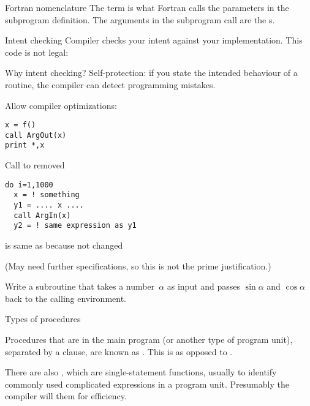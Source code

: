 \begin{block}{Fortran nomenclature}
  \label{sl:fortran-dummy}
  The term  is what Fortran calls the
  parameters in the subprogram definition. The arguments in the
  subprogram call are the s.
\end{block}

\begin{block}{Intent checking}
  \label{sl:fintent}
  Compiler checks your intent against your implementation. This code
  is not legal:

\end{block}

\begin{block}{Why intent checking?}
\label{sl:intentwhy}
Self-protection: if you state the intended behaviour of a routine, the
compiler can detect programming mistakes.

Allow compiler optimizations:

\begin{multicols}{2}
\begin{verbatim}
x = f()
call ArgOut(x)
print *,x
\end{verbatim}
Call to  removed
\vfill\columnbreak
\begin{verbatim}
do i=1,1000
  x = ! something
  y1 = .... x ....
  call ArgIn(x)
  y2 = ! same expression as y1
\end{verbatim}
 is same as  because  not changed
\end{multicols}
(May need further specifications, so this is not the prime justification.)
\end{block}

\begin{exercise}
  \label{ex:ffunc-sin-cos}
  Write a subroutine  that takes a number~$\alpha$ as input
  and passes $\sin\alpha$ and $\cos\alpha$ back to the calling
  environment.
\end{exercise}

 {Types of procedures}

Procedures that are in the main program (or another type of program
unit), separated by a  clause, are known as
. This is as opposed to
.

There are also , which are
single-statement functions, usually to identify commonly used
complicated expressions in a program unit. Presumably the compiler
will  them for efficiency.

